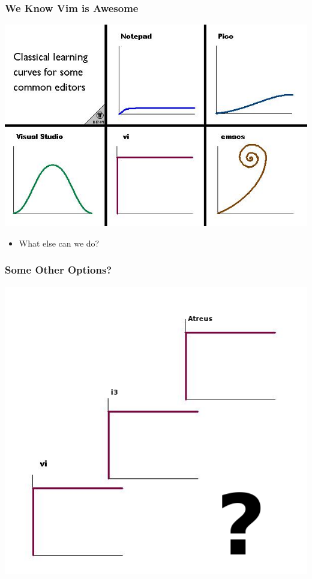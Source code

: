 \documentclass{beamer}
\begin{document}
\begin{frame}
  \frametitle{We Know Vim is Awesome}
  \includegraphics[scale=0.5]{images/curves}
  \begin{itemize}
    \item What else can we do?
  \end{itemize}
\end{frame}

\begin{frame}
  \frametitle{Some Other Options?}
  \includegraphics[scale=0.5]{images/ladder}
\end{frame}
\end{document}
